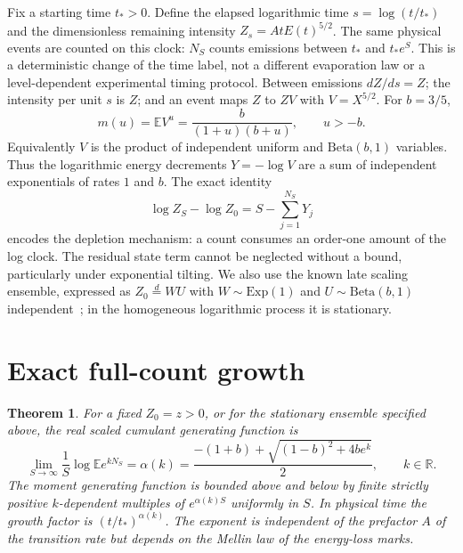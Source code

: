 \documentclass[10pt]{article}
\newtheorem{theorem}{Theorem}
\newcommand{\E}{\mathbb E}
\begin{document}
Fix a starting time $t_*>0$. Define the elapsed logarithmic time $s=\log(t/t_*)$ and the dimensionless remaining intensity $Z_s=AtE(t)^{5/2}$. The same physical events are counted on this clock: $N_S$ counts emissions between $t_*$ and $t_*e^S$. This is a deterministic change of the time label, not a different evaporation law or a level-dependent experimental timing protocol. Between emissions $dZ/ds=Z$; the intensity per unit $s$ is $Z$; and an event maps $Z$ to $ZV$ with $V=X^{5/2}$. For $b=3/5$,
\begin{equation}
m(u)=\E V^u=\frac{b}{(1+u)(b+u)},\qquad u>-b.
\label{eq:mellin}
\end{equation}
Equivalently $V$ is the product of independent uniform and $\mathrm{Beta}(b,1)$ variables. Thus the logarithmic energy decrements $Y=-\log V$ are a sum of independent exponentials of rates $1$ and $b$. The exact identity
\begin{equation}
\log Z_S-\log Z_0=S-\sum_{j=1}^{N_S}Y_j
\label{eq:identity}
\end{equation}
encodes the depletion mechanism: a count consumes an order-one amount of the log clock. The residual state term cannot be neglected without a bound, particularly under exponential tilting. We also use the known late scaling ensemble, expressed as $Z_0\overset{d}=WU$ with $W\sim\mathrm{Exp}(1)$ and $U\sim\mathrm{Beta}(b,1)$ independent~\cite{Biggs}; in the homogeneous logarithmic process it is stationary.

\section{Exact full-count growth}
\begin{theorem}
For a fixed $Z_0=z>0$, or for the stationary ensemble specified above, the real scaled cumulant generating function is
\begin{equation}
\lim_{S\to\infty}\frac{1}{S}\log\E e^{kN_S}
 =\alpha(k)=\frac{-(1+b)+\sqrt{(1-b)^2+4be^k}}{2},
 \qquad k\in\mathbb R.
\label{eq:scgf}
\end{equation}
The moment generating function is bounded above and below by finite strictly positive $k$-dependent multiples of $e^{\alpha(k)S}$ uniformly in $S$. In physical time the growth factor is $(t/t_*)^{\alpha(k)}$. The exponent is independent of the prefactor $A$ of the transition rate but depends on the Mellin law of the energy-loss marks.
\end{theorem}
\end{document}

